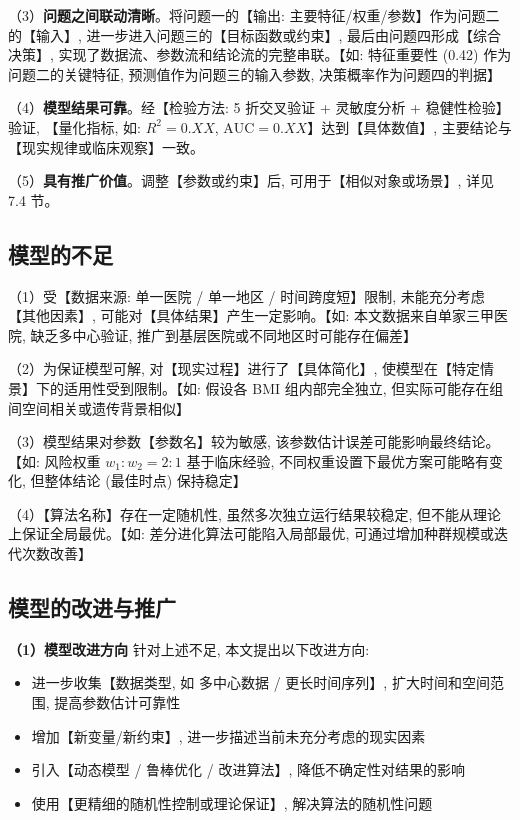 （3）\textbf{问题之间联动清晰}。将问题一的【输出: 主要特征/权重/参数】作为问题二的【输入】, 进一步进入问题三的【目标函数或约束】, 最后由问题四形成【综合决策】, 实现了数据流、参数流和结论流的完整串联。【如: 特征重要性 (0.42) 作为问题二的关键特征, 预测值作为问题三的输入参数, 决策概率作为问题四的判据】

（4）\textbf{模型结果可靠}。经【检验方法: 5 折交叉验证 + 灵敏度分析 + 稳健性检验】验证, 【量化指标, 如: $R^2 = 0.XX$, $\text{AUC} = 0.XX$】达到【具体数值】, 主要结论与【现实规律或临床观察】一致。

（5）\textbf{具有推广价值}。调整【参数或约束】后, 可用于【相似对象或场景】, 详见 7.4 节。

\subsection{模型的不足}

（1）受【数据来源: 单一医院 / 单一地区 / 时间跨度短】限制, 未能充分考虑【其他因素】, 可能对【具体结果】产生一定影响。【如: 本文数据来自单家三甲医院, 缺乏多中心验证, 推广到基层医院或不同地区时可能存在偏差】

（2）为保证模型可解, 对【现实过程】进行了【具体简化】, 使模型在【特定情景】下的适用性受到限制。【如: 假设各 BMI 组内部完全独立, 但实际可能存在组间空间相关或遗传背景相似】

（3）模型结果对参数【参数名】较为敏感, 该参数估计误差可能影响最终结论。【如: 风险权重 $w_1:w_2 = 2:1$ 基于临床经验, 不同权重设置下最优方案可能略有变化, 但整体结论 (最佳时点) 保持稳定】

（4）【算法名称】存在一定随机性, 虽然多次独立运行结果较稳定, 但不能从理论上保证全局最优。【如: 差分进化算法可能陷入局部最优, 可通过增加种群规模或迭代次数改善】

\subsection{模型的改进与推广}

\textbf{（1）模型改进方向} \quad 针对上述不足, 本文提出以下改进方向:
\begin{itemize}
  \item 进一步收集【数据类型, 如 多中心数据 / 更长时间序列】, 扩大时间和空间范围, 提高参数估计可靠性
  \item 增加【新变量/新约束】, 进一步描述当前未充分考虑的现实因素
  \item 引入【动态模型 / 鲁棒优化 / 改进算法】, 降低不确定性对结果的影响
  \item 使用【更精细的随机性控制或理论保证】, 解决算法的随机性问题
\end{itemize}

